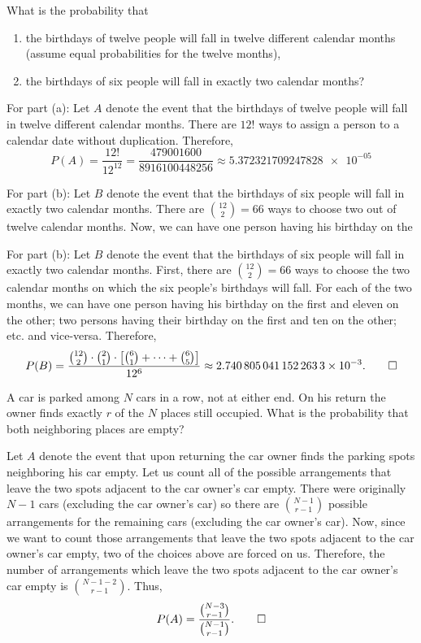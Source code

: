\begin{problem}[Handout 2, \# 14]
  What is the probability that
  \begin{enumerate}[label=(\alph*),noitemsep]
  \item the birthdays of twelve people will fall in twelve different
    calendar months (assume equal probabilities for the twelve months),
  \item the birthdays of six people will fall in exactly two calendar
    months?
  \end{enumerate}
\end{problem}
\begin{solution*}
  For part (a): Let \(A\) denote the event that the birthdays of twelve
  people will fall in twelve different calendar months. There are \(12!\)
  ways to assign a person to a calendar date without
  duplication. Therefore,
  \[
    P(A)=\frac{12!}{12^{12}}=
    \frac{\num{479001600}}{\num{8916100448256}}
    \approx\num{5.372321709247828e-05}
  \]

  For part (b): Let \(B\) denote the event that the birthdays of six people
  will fall in exactly two calendar months. There are \(\binom{12}{2}=66\)
  ways to choose two out of twelve calendar months. Now, we can have one
  person having his birthday on the

  For part (b): Let \(B\) denote the event that the birthdays of six people
  will fall in exactly two calendar months. First, there are
  \(\binom{12}{2}=66\) ways to choose the two calendar months on which the
  six people's birthdays will fall. For each of the two months, we can have
  one person having his birthday on the first and eleven on the other; two
  persons having their birthday on the first and ten on the other; etc.\@
  and vice-versa. Therefore,
  \[
    P(B)=%
    \frac{\binom{12}{2}\cdot \binom{2}{1}%
      \cdot\left[\binom{6}{1}+\dotsb+\binom{6}{5}\right]}%
    {12^6}%
    \approx
    \num{2.7408050411522633e-03}.\qedhere
  \]
\end{solution*}

\begin{problem}[Handout 2, \# 15]
  A car is parked among \(N\) cars in a row, not at either end. On his
  return the owner finds exactly \(r\) of the \(N\) places still
  occupied. What is the probability that both neighboring places are empty?
\end{problem}
\begin{solution*}
  Let \(A\) denote the event that upon returning the car owner finds the
  parking spots neighboring his car empty. Let us count all of the possible
  arrangements that leave the two spots adjacent to the car owner's car
  empty. There were originally \(N-1\) cars (excluding the car owner's car)
  so there are \(\binom{N-1}{r-1}\) possible arrangements for the remaining
  cars (excluding the car owner's car). Now, since we want to count those
  arrangements that leave the two spots adjacent to the car owner's car
  empty, two of the choices above are forced on us. Therefore, the number
  of arrangements which leave the two spots adjacent to the car owner's car
  empty is \(\binom{N-1-2}{r-1}\). Thus,
  \[
    P(A)=\frac{\binom{N-3}{r-1}}{\binom{N-1}{r-1}}.\qedhere
  \]
\end{solution*}

